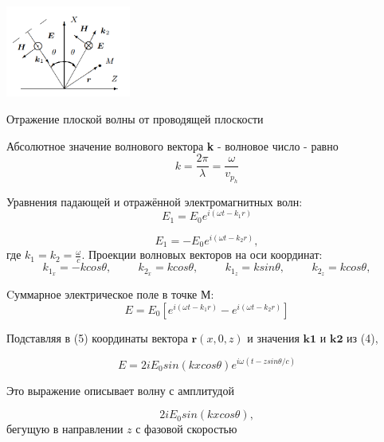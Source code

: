 \documentclass[a4paper]{article}
\begin{document}
\begin{floatingfigure}{41mm}
\noindent
\hfil
\includegraphics[width=41mm]{fig1.PNG}
\hfil
\caption{Отражение плоской волны от проводящей плоскости}
\label{figCurvesFF}
\end{floatingfigure}

Абсолютное значение волнового вектора \textbf{k} - волновое число - равно
\begin{equation}
k = \frac{2\pi}{\lambda} = \frac{\omega}{v_p_h}
\end{equation}


Уравнения падающей и отражённой электромагнитных волн:
\begin{equation}
    E_1 = E_0 e^{i(\omega t - k_1r)}
\end{equation}

\begin{equation}
    E_1 = - E_0 e^{i(\omega t - k_2r)},
\end{equation}
 где $k_1 = k_2 = \frac{\omega}{c}$. Проекции волновых векторов на оси координат:
 \begin{equation}
     k_1_x = -k cos\theta,\hspace{1cm}   
     k_2_x = k cos\theta,\hspace{1cm}
     k_1_z = k sin\theta,\hspace{1cm} 
     k_2_z = k cos\theta, 
 \end{equation}
 
 Cуммарное электрическое поле в точке М:
 \begin{equation}
     E = E_0[ e^{i(\omega t - k_1r)} - e^{i(\omega t - k_2r)}]
 \end{equation}
 
 Подставляя в (5) координаты вектора $\textbf{r}(x, 0, z)$ и значения $ \textbf{k1} $ и $ \textbf{k2} $ из (4), 
 
 \begin{equation}
     E = 2iE_0 sin(kxcos\theta) e^{i\omega(t - z sin\theta / c)}
 \end{equation}
 
 Это выражение описывает волну с амплитудой
 
 \begin{equation}
     2iE_0 sin(kxcos\theta),
 \end{equation}
 бегущую в направлении $z$ с фазовой скоростью
 
\end{document}
